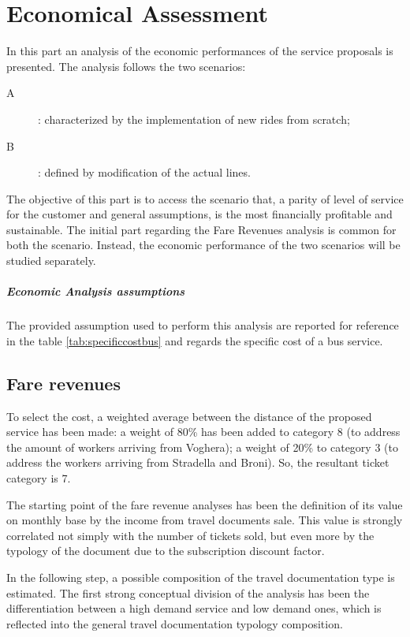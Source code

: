 \chapter{Economical Assessment}
In this part an analysis of the economic performances of the service proposals is presented. The analysis follows the two scenarios:
\begin{description}
\item[A]: characterized by the implementation of new rides from scratch;
\item[B]: defined by modification of the actual lines.
\end{description}

The objective of this part is to access the scenario that, a parity of level of service for the customer and general assumptions, is the most financially profitable and sustainable.
The initial part regarding the Fare Revenues analysis is common for both the scenario. Instead, the economic performance of the two scenarios will be studied separately.

\paragraph{Economic Analysis assumptions}
The provided assumption used to perform this analysis are reported for reference in the table \ref{tab:specificcostbus} and regards the specific cost of a bus service. 



\section{Fare revenues}
To select the cost, a weighted average between the distance of the proposed service has been made: a weight of 80\% has been added to category 8 (to address the amount of workers arriving from Voghera); a weight of 20\% to category 3 (to address the workers arriving from Stradella and Broni). So, the resultant ticket category is 7.

The starting point of the fare revenue analyses has been the definition of its value on monthly base by the income from travel documents sale. This value is strongly correlated not simply with the number of tickets sold, but even more by the typology of the document due to the subscription discount factor.

In the following step, a possible composition of the travel documentation type is estimated. The first strong conceptual division of the analysis has been the differentiation between a high demand service and low demand ones, which is reflected into the general travel documentation typology composition.

